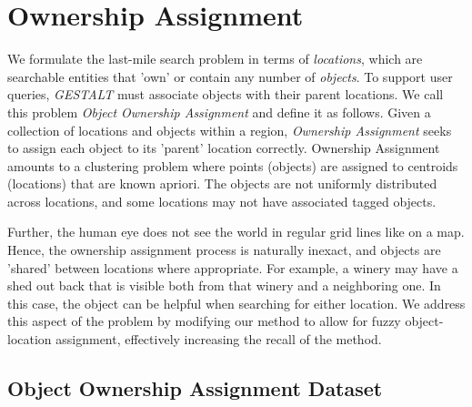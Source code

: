 \section{Ownership Assignment}
\label{section:ownership}

We formulate the last-mile search problem in terms of \textit{locations}, which are searchable entities that 'own' or contain any number of \textit{objects}. %
To support user queries, \emph{GESTALT} must associate objects with their parent locations.
We call this problem \textit{Object Ownership Assignment} and define it as follows.
Given a collection of locations and objects within a region, \emph{Ownership Assignment} seeks to assign each object to its 'parent' location correctly. 
Ownership Assignment amounts to a clustering problem where points (objects) are assigned to centroids (locations) that are known apriori. 
The objects are not uniformly distributed across locations, and some locations may not have associated tagged objects. 

Further, the human eye does not see the world in regular grid lines like on a map. Hence, the ownership assignment process is naturally inexact, and objects are 'shared' between locations where appropriate.
For example, a winery may have a shed out back that is visible both from that winery and a neighboring one. 
In this case, the object can be helpful when searching for either location. 
We address this aspect of the problem by modifying our method to allow for fuzzy object-location assignment, effectively increasing the recall of the method. 

\subsection{Object Ownership Assignment Dataset}

